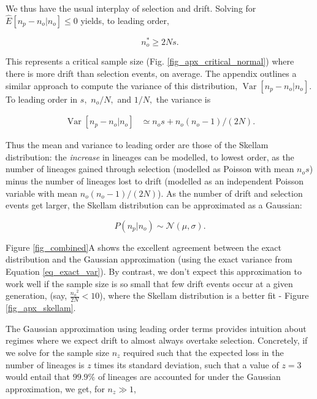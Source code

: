 \documentclass[review,nonatbib]{elsarticle}
\begin{document}
We thus have the usual interplay of selection and drift. Solving for $ \hat{E}[n_p -n_o | n_o]\leq0$
yields, to leading order,

\begin{equation}
  \label{eq_critical_sample}
  n_o^* \ge 2N s.
\end{equation}

This represents a critical sample size (Fig.
\ref{fig_apx_critical_normal}) where there is more drift than selection events, on average. 
The appendix outlines a similar approach to compute the variance of this distribution, $\operatorname{Var}[n_p-n_o | n_o].$ 
To leading order in $s,$ $n_o/N,$ and $1/N,$ the variance is 

\begin{equation}
  \begin{aligned}
    \operatorname{Var}[n_p-n_o | n_o] &\simeq
   n_o  s +   n_o (n_o-1)/(2 N).
    \label{eq_gauss_var}
  \end{aligned}
\end{equation}

Thus the mean and variance to leading order are those of the Skellam distribution: the
\textit{increase} in lineages can be modelled, to lowest order, as the number of lineages gained
through selection (modelled as Poisson with mean  $ n_o s$) minus the number of lineages lost to
drift (modelled as an independent Poisson variable with mean  $ n_o (n_o-1)/(2 N)$).
As the number of drift and selection events get larger, the Skellam distribution can be approximated as a
Gaussian:

\begin{equation}
  P(n_p|n_o) \sim \mathcal{N}(\mu, \sigma).
  \label{eq_gaussian}
\end{equation}

Figure \ref{fig_combined}A shows the excellent agreement between the exact distribution and the
Gaussian approximation (using the exact variance from Equation \ref{eq_exact_var}). By contrast,
we don't expect this approximation to work well if the sample size is so small that few drift
events occur at a given generation, (say, $\frac{{n_o}^2}{2N} < 10$), where the Skellam
distribution is a better fit - Figure \ref{fig_apx_skellam}.
 
The Gaussian approximation using leading order terms provides intuition about regimes where we
expect drift to almost always overtake selection.  Concretely, if we solve for the sample size
$n_z$ required such that the expected loss in the number of lineages is $z$ times its standard deviation,
such that a value of $z=3$ would entail that $99.9\%$ of lineages are accounted for under the Gaussian approximation,
we get, for $n_z\gg 1$,
\end{document}
